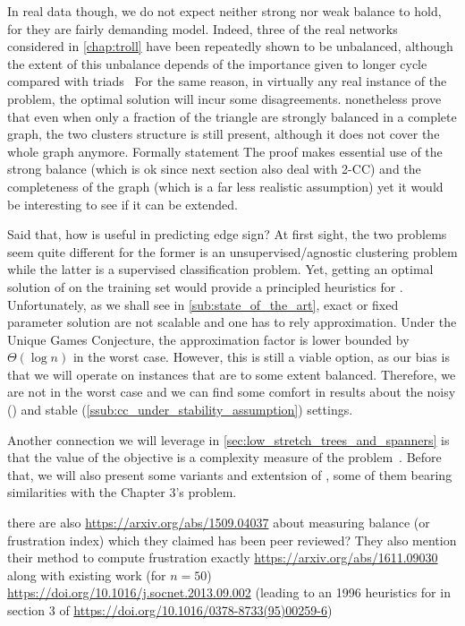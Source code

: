 In real data though, we do not expect neither strong nor weak balance to hold, for they are fairly
demanding model. Indeed, three of the real networks considered in \autoref{chap:troll} have been
repeatedly shown to be unbalanced, although the extent of this unbalance depends of the importance
given to longer cycle compared with triads~\autocites{Facchetti2011isingmodel}{measureUnbalance14}%
{measureUnbalance17} For the same reason, in virtually any real instance of the \pcc{} problem, the
optimal solution will incur some disagreements. \Textcite[Section 5.5]{BookKleinberg2010}
nonetheless prove that even when only a fraction of the triangle are strongly balanced in a complete
graph, the two clusters structure is still present, although it does not cover the whole graph
anymore. Formally statement
The proof makes essential use of the strong balance (which is ok since next section also deal with
2-CC) and the completeness of the graph (which is a far less realistic assumption) yet it would be
interesting to see if it can be extended.

Said that, how is \pcc{} useful in predicting edge sign? At first sight, the two problems seem quite
different for the former is an unsupervised/agnostic clustering problem while the latter is a
supervised classification problem. Yet, getting an optimal solution of \pcc{} on the training set
would provide a principled heuristics for \esp{}. Unfortunately, as we shall see in
\autoref{sub:state_of_the_art}, exact or fixed parameter solution are not scalable and one has to
rely approximation. Under the Unique Games Conjecture, the approximation factor is lower bounded by
$\Theta(\log n)$ in the worst case. However, this is still a viable option, as our bias is that we
will operate on instances that are to some extent balanced. Therefore, we are not in the worst case
and we can find some comfort in results about the noisy () and
stable (\autoref{ssub:cc_under_stability_assumption}) settings.

Another connection we will leverage in \autoref{sec:low_stretch_trees_and_spanners} is that the
value of the \mind{} objective is a complexity measure of the \esp{} problem~\autocite[Section
4.1]{Cesa-Bianchi2012b}. Before that, we will also present some variants and extentsion of \pcc{},
some of them bearing similarities with the Chapter 3's problem.

there are also \url{https://arxiv.org/abs/1509.04037} about measuring balance (or frustration index)
which they claimed has been peer reviewed? They also mention their method to compute frustration
exactly \url{https://arxiv.org/abs/1611.09030} along with existing work (for $n=50$)
\url{https://doi.org/10.1016/j.socnet.2013.09.002} (leading to an 1996 heuristics for \pcc{} in
section 3 of \url{https://doi.org/10.1016/0378-8733(95)00259-6})

